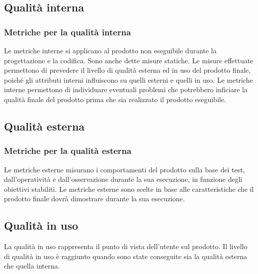 \vspace{2cm}

\subsection{Qualità interna} \label{subsection:qualita_interna}
\subsubsection{Metriche per la qualità interna}
Le metriche interne si applicano al prodotto non eseguibile durante la progettazione e la codifica. Sono anche dette misure statiche.
Le misure effettuate permettono di prevedere il livello di qualità esterna ed in uso del prodotto finale, poiché gli attributi interni influiscono su quelli esterni e quelli in uso.
Le metriche interne permettono di individuare eventuali problemi che potrebbero inficiare la qualità finale del prodotto prima che sia realizzato il prodotto eseguibile.

\vspace{2cm}

\subsection{Qualità esterna} \label{subsection:qualita_esterna}
\subsubsection{Metriche per la qualità esterna}
Le metriche esterne misurano i comportamenti del prodotto sulla base dei test, dall'operatività e dall'osservazione durante la sua esecuzione, in funzione degli obiettivi stabiliti.
Le metriche esterne sono scelte in base alle caratteristiche che il prodotto finale dovrà dimostrare durante la sua esecuzione.

\vspace{2cm}

\subsection{Qualità in uso} \label{subsection:qualita_uso}
La qualità in uso rappresenta il punto di vista dell'utente sul prodotto. Il livello di qualità in uso è raggiunto quando sono state conseguite sia la qualità esterna che quella interna.
